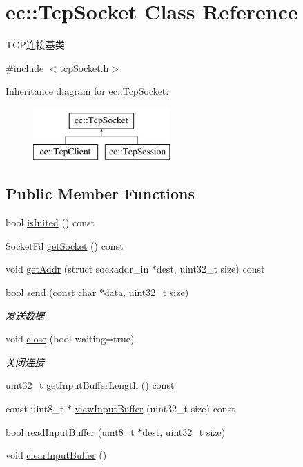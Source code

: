 \hypertarget{classec_1_1TcpSocket}{\section{ec\-:\-:Tcp\-Socket Class Reference}
\label{classec_1_1TcpSocket}
}


T\-C\-P连接基类  




{\ttfamily \#include $<$tcp\-Socket.\-h$>$}

Inheritance diagram for ec\-:\-:Tcp\-Socket\-:\begin{figure}[H]
\begin{center}
\leavevmode
\includegraphics[height=2.000000cm]{classec_1_1TcpSocket}
\end{center}
\end{figure}
\subsection*{Public Member Functions}
\begin{DoxyCompactItemize}
\item 
bool \hyperlink{classec_1_1TcpSocket_a75615a2cb729bf1e11f7bf9414dedb6e}{is\-Inited} () const 
\item 
Socket\-Fd \hyperlink{classec_1_1TcpSocket_a5612ba87be272ed6dcc50d3dd097070c}{get\-Socket} () const 
\item 
void \hyperlink{classec_1_1TcpSocket_ac2b55cbb75000a218b3c1d83c1365611}{get\-Addr} (struct sockaddr\-\_\-in $\ast$dest, uint32\-\_\-t size) const 
\item 
bool \hyperlink{classec_1_1TcpSocket_af9e2fdbb732d93537e2867eeebc34ab2}{send} (const char $\ast$data, uint32\-\_\-t size)
\begin{DoxyCompactList}\small\item\em 发送数据 \end{DoxyCompactList}\item 
void \hyperlink{classec_1_1TcpSocket_aac8cfc7de1d70f850ec304a40ef814a6}{close} (bool waiting=true)
\begin{DoxyCompactList}\small\item\em 关闭连接 \end{DoxyCompactList}\item 
uint32\-\_\-t \hyperlink{classec_1_1TcpSocket_a73baa70135fad8207968cfc2c7c6fe2a}{get\-Input\-Buffer\-Length} () const 
\item 
const uint8\-\_\-t $\ast$ \hyperlink{classec_1_1TcpSocket_a50a9ce465e5c0e0c20fe63f99cc294af}{view\-Input\-Buffer} (uint32\-\_\-t size) const 
\item 
bool \hyperlink{classec_1_1TcpSocket_a64a402951553c83c1ba6be46fcf642d0}{read\-Input\-Buffer} (uint8\-\_\-t $\ast$dest, uint32\-\_\-t size)
\item 
void \hyperlink{classec_1_1TcpSocket_a55626e2cba2d193b4aa04ee0fc8a197e}{clear\-Input\-Buffer} ()
\end{DoxyCompactItemize}
